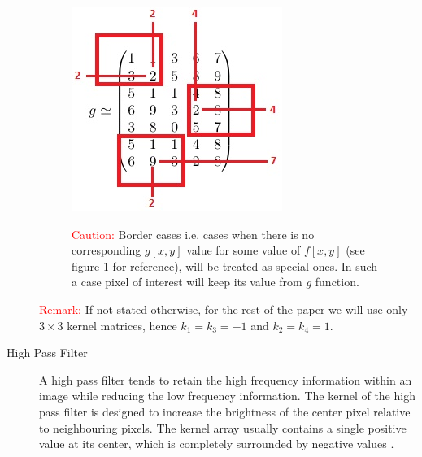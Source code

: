 \documentclass{article}
\begin{document}
\begin{description}
\begin{figure}
\noindent
\begin{minipage}{0.3\textwidth}%
	\includegraphics[width=\linewidth]{_Figures/conv_filter_border.jpg} 
	\caption{}
	\label{fig:caution}
\end{minipage}%
\hfill%
\begin{minipage}{0.6\textwidth}\raggedleft
\textcolor{red}{Caution:} Border cases i.e. cases when there is no corresponding $g[x,y]$ value for some value of $f[x,y]$ (see figure \ref{fig:caution} for reference), will be treated as special ones. In such a case pixel of interest will keep its value from $g$ function.
\end{minipage}
\end{figure}

\textcolor{red}{Remark:} If not stated otherwise, for the rest of the paper we will use only $3 \times 3$ kernel matrices, hence $k_1 = k_3 = -1$ and $k_2 = k_4 = 1$.

%
%
\item[High Pass Filter]
A high pass filter tends to retain the high frequency information within an image while reducing the low frequency information. The kernel of the high pass filter is designed to increase the brightness of the center pixel relative to neighbouring pixels. The kernel array usually contains a single positive value at its center, which is completely surrounded by negative values \cite{high_pass_def}. 


\end{description}
\end{document}
